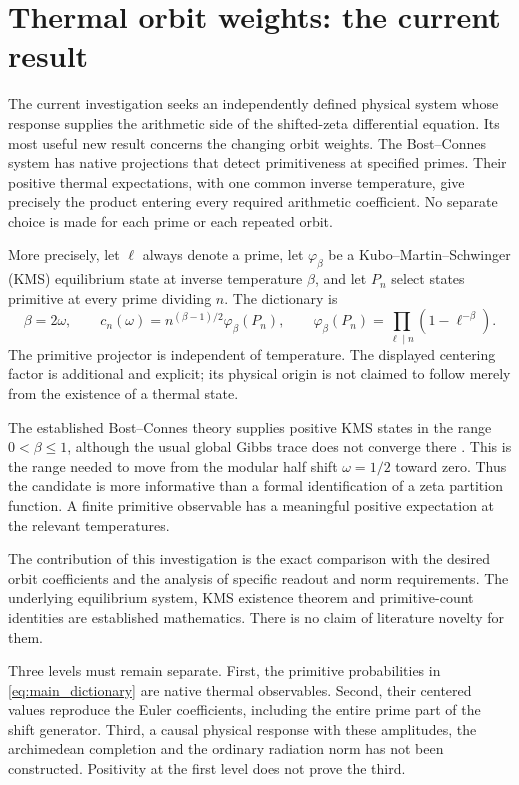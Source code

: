 \section{Thermal orbit weights: the current result}
\label{sec:scope}

The current investigation seeks an independently defined physical system
whose response supplies the arithmetic side of the shifted-zeta
differential equation. Its most useful new result concerns the changing
orbit weights. The Bost--Connes system has native projections that detect
primitiveness at specified primes. Their positive thermal expectations,
with one common inverse temperature, give precisely the product entering
every required arithmetic coefficient. No separate choice is made for
each prime or each repeated orbit.

More precisely, let $\ell$ always denote a prime, let $\varphi_\beta$ be
a Kubo--Martin--Schwinger (KMS) equilibrium state at inverse temperature
$\beta$, and let $P_n$ select states primitive at every prime dividing
$n$. The dictionary is
\begin{equation}
 \boxed{\quad \beta=2\omega,\qquad
 c_n(\omega)=n^{(\beta-1)/2}\varphi_\beta(P_n),\qquad
 \varphi_\beta(P_n)=\prod_{\ell\mid n}(1-\ell^{-\beta}).\quad}
 \label{eq:main_dictionary}
\end{equation}
The primitive projector is independent of temperature. The displayed
centering factor is additional and explicit; its physical origin is not
claimed to follow merely from the existence of a thermal state.

The established Bost--Connes theory supplies positive KMS states in the
range $0<\beta\le1$, although the usual global Gibbs trace does not
converge there \cite{BC,Neshveyev}. This is the range needed to move from
the modular half shift $\omega=1/2$ toward zero. Thus the candidate is
more informative than a formal identification of a zeta partition
function. A finite primitive observable has a meaningful positive
expectation at the relevant temperatures.

The contribution of this investigation is the exact comparison with
the desired orbit coefficients and the analysis of specific readout and
norm requirements. The underlying equilibrium system, KMS existence
theorem and primitive-count identities are established mathematics.
There is no claim of literature novelty for them.

Three levels must remain separate. First, the primitive probabilities
in \eqref{eq:main_dictionary} are native thermal observables. Second,
their centered values reproduce the Euler coefficients, including the
entire prime part of the shift generator. Third, a causal physical
response with these amplitudes, the archimedean completion and the
ordinary radiation norm has not been constructed. Positivity at the
first level does not prove the third.

